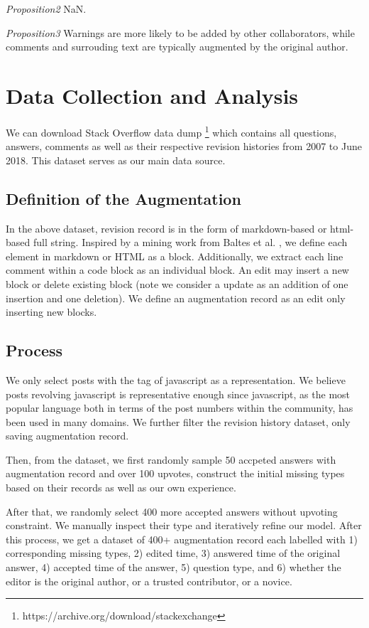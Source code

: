 \documentclass[10pt,conference]{IEEEtran}
\begin{document}
{\em Proposition2}
NaN.

{\em Proposition3}
Warnings are more likely to be added by other collaborators, while comments and surrouding text are typically augmented by the original author. 



\section {Data Collection and Analysis}
We can download Stack Overflow data dump \footnote{https://archive.org/download/stackexchange} which contains all questions, answers, comments as well as their respective revision histories from 2007 to June 2018. This dataset serves as our main data source.

\subsection {Definition of the Augmentation}
In the above dataset, revision record is in the form of markdown-based or html-based full string. Inspired by a mining work from Baltes et al. \cite{DBLP:journals/corr/abs-1803-07311}, we define each element in markdown or HTML as a block. Additionally, we extract each line comment within a code block as an individual block. An edit may insert a new block or delete existing block (note we consider a update as an addition of one insertion and one deletion). We define an augmentation record as an edit only inserting new blocks. 



\subsection {Process}
We only select posts with the tag of javascript as a representation. We believe posts revolving javascript is representative enough since javascript, as the most popular language both in terms of the post numbers within the community, has been used in many domains. We further filter the revision history dataset, only saving augmentation record.  

Then, from the dataset, we first randomly sample 50 accpeted answers with augmentation record and over 100 upvotes, construct the initial missing types based on their records as well as our own experience.

After that, we randomly select 400 more accepted answers without upvoting constraint. We manually inspect their type and iteratively refine our model. After this process, we get a dataset of 400+ augmentation record each labelled with 1) corresponding missing types, 2) edited time, 3) answered time of the original answer, 4) accepted time of the answer, 5) question type, and 6) whether the editor is the original author, or a trusted contributor, or a novice.
\end{document}

